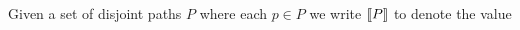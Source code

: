 \begin{comment}
\begin{figure}[t]
\centering
\begin{tabular}{c}
\rn{O-Finish}
\(
\inferrule{
  \Ac := x
  \quad
  x : \tau
  \quad
  \tau \in \Nondata
  \quad
  c \not\in \tEc
}{
  \Ac := \emptyset \quad \Ec := \Ec \cup \{ x \teq c \}
}
\)
\\[3.7ex]
\rn{C-Finish}
\(
\inferrule{
  \Ac := x
  \quad
  x : \tau
  \quad
  \tau \in \Codata
  \quad
  C_i \in \Ctr^\tau
  \quad 
  C_i \not\in \{ C_j \mid d \in \Dc, C_j( \vec t ) \in d \}
}{
  \Ac := \emptyset \quad \Ec := \Ec \cup \{ x \teq C_i( \vec y ) \} \quad \Rc := \Rc \cup \vec y
}
\)
\\[3.7ex]
\rn{C-Rec}
\(
\inferrule{
  \Ac := x
  \quad
  x : \tau
  \quad
  \tau \in \Codata
  \quad
  C_i \in \Ctr^\tau
  \quad
  C_i \text{ infinite arg } j
}{
  \Ac := y_j \quad 
  \Ec := \Ec \cup \{ x \teq C_i( \vec y ) \} \quad 
  \Rc := \Rc \cup ( \vec y \setminus y_j ) \quad 
  \Dc := \dpath{\Ec}{C_i,j}{\Dc}
}
\)
\end{tabular}
\caption{Rules for completion.
}
\label{fig:completion-rules}
\end{figure}
\end{comment}



Given a set of disjoint paths $P$ where each $p \in P$
we write $[\![ P ]\!]$ to denote the value

